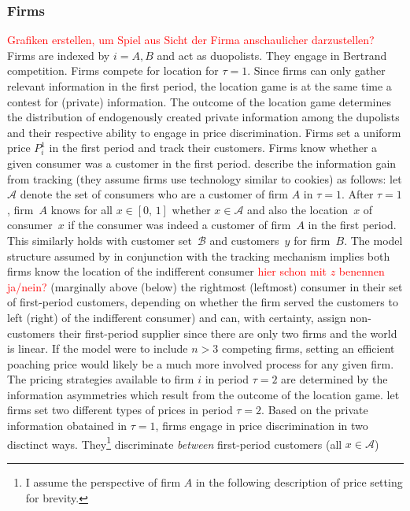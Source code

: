 \documentclass[a4paper, 11 pt, fleqn]{article}
\begin{document}
\subsubsection{Firms} \label{ssec:choe-firms}
\textcolor{red}{Grafiken erstellen, um Spiel aus Sicht der Firma anschaulicher darzustellen?}
Firms are indexed by $i = A,B$ and act as duopolists. They engage in Bertrand competition. Firms compete for location for $\tau=1$.
Since firms can only gather relevant information in the first period, the location game is at the same time a contest for (private)
information. The outcome of the location game determines the distribution of endogenously created private information among the dupolists and
their respective ability to engage in price discrimination. Firms set a uniform price $P^1_i$ in the first period and track their customers.
Firms know whether a given consumer was a customer in the first period. \citet[p. 5672]{Choe.2018} describe the information gain from
tracking (they assume firms use technology similar to cookies) as follows: let $\mathscr{A}$ denote the set of consumers who are a
customer of firm $A$ in $\tau=1$. After $\tau=1$, firm~$A$ knows for all $x \in [0,\,1]$ whether $x\in \mathscr{A}$ and also the
location~$x$ of consumer~$x$ if the consumer was indeed a customer of firm~$A$ in the first period. This similarly holds with
customer set~$\mathscr{B}$ and customers~$y$ for firm~$B$. The model structure assumed by \citet{Choe.2018} in conjunction with the
tracking mechanism implies both firms know the location of the indifferent consumer \textcolor{red}{hier schon mit $z$ benennen ja/nein?}
(marginally above (below) the rightmost (leftmost) consumer in their set of first-period customers, depending on whether the firm served
the customers to left (right) of the indifferent consumer) and can, with certainty, assign non-customers their first-period supplier since
there are only two firms and the world is linear. If the model were to include $n > 3$ competing firms, setting an efficient poaching price
would likely be a much more involved process for any given firm. \\
The pricing strategies available to firm $i$ in period $\tau=2$ are determined by the information asymmetries which result from the outcome
of the location game. \citet[p. 5672]{Choe.2018} let firms set two different types of prices in period $\tau=2$. Based on the private
information obatained in $\tau=1$, firms engage in price discrimination in two disctinct ways. They\footnote{I assume the perspective
of firm $A$ in the following description of price setting for brevity.} discriminate \textit{between} first-period customers (all $x\in\mathscr{A}$)
\end{document}
